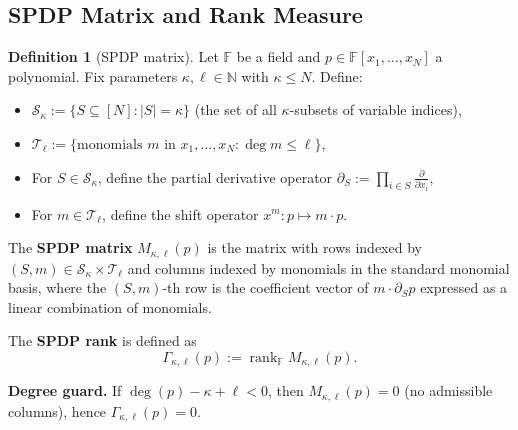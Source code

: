 \documentclass[12pt]{article}
\theoremstyle{definition}
\newtheorem{definition}{Definition}
\theoremstyle{definition}
\theoremstyle{remark}
\theoremstyle{remark}
\begin{document}
\subsection{SPDP Matrix and Rank Measure}

\begin{definition}[SPDP matrix]\label{def:spdp-matrix-formal}\label{def:spdp-matrix}
Let $\mathbb{F}$ be a field and $p \in \mathbb{F}[x_1, \ldots, x_N]$ a polynomial. Fix parameters $\kappa, \ell \in \mathbb{N}$ with $\kappa \leq N$. Define:
\begin{itemize}
\item $\mathcal{S}_\kappa := \{S \subseteq [N] : |S| = \kappa\}$ (the set of all $\kappa$-subsets of variable indices),
\item $\mathcal{T}_\ell := \{\text{monomials } m \text{ in } x_1, \ldots, x_N : \deg m \leq \ell\}$,
\item For $S \in \mathcal{S}_\kappa$, define the partial derivative operator $\partial_S := \prod_{i \in S} \frac{\partial}{\partial x_i}$,
\item For $m \in \mathcal{T}_\ell$, define the shift operator $x^m : p \mapsto m \cdot p$.
\end{itemize}
The \textbf{SPDP matrix} $M_{\kappa,\ell}(p)$ is the matrix with rows indexed by $(S, m) \in \mathcal{S}_\kappa \times \mathcal{T}_\ell$ and columns indexed by monomials in the standard monomial basis, where the $(S,m)$-th row is the coefficient vector of $m \cdot \partial_S p$ expressed as a linear combination of monomials.

The \textbf{SPDP rank} is defined as
\[
\Gamma_{\kappa,\ell}(p) := \operatorname{rank}_{\mathbb{F}} M_{\kappa,\ell}(p).
\]
\end{definition}

\noindent\textbf{Degree guard.} If $\deg(p)-\kappa+\ell<0$, then $M_{\kappa,\ell}(p)=0$ (no admissible columns), hence $\Gamma_{\kappa,\ell}(p)=0$.
\end{document}
